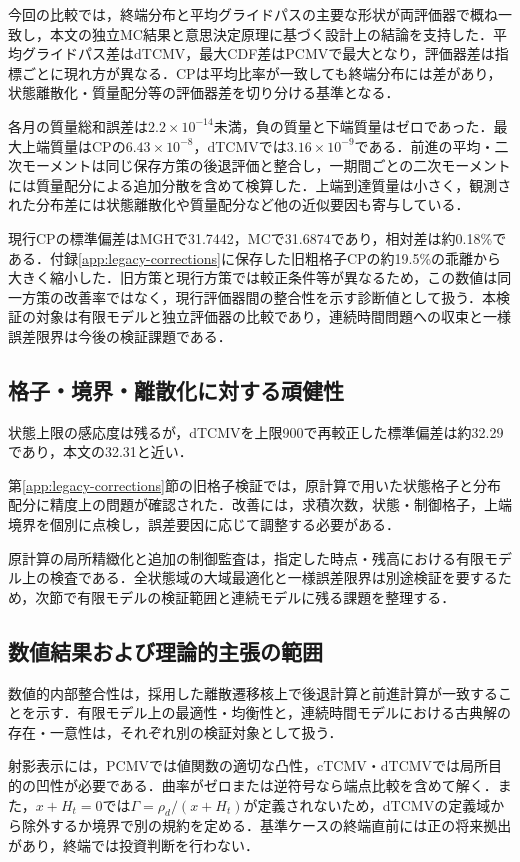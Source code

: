 \documentclass[10pt,a4paper]{article}
\theoremstyle{plain}
\theoremstyle{definition}
\begin{document}
今回の比較では，終端分布と平均グライドパスの主要な形状が両評価器で概ね一致し，本文の独立MC結果と意思決定原理に基づく設計上の結論を支持した．平均グライドパス差はdTCMV，最大CDF差はPCMVで最大となり，評価器差は指標ごとに現れ方が異なる．CPは平均比率が一致しても終端分布には差があり，状態離散化・質量配分等の評価器差を切り分ける基準となる．

各月の質量総和誤差は$2.2\times10^{-14}$未満，負の質量と下端質量はゼロであった．最大上端質量はCPの$6.43\times10^{-8}$，dTCMVでは$3.16\times10^{-9}$である．前進の平均・二次モーメントは同じ保存方策の後退評価と整合し，一期間ごとの二次モーメントには質量配分による追加分散を含めて検算した．上端到達質量は小さく，観測された分布差には状態離散化や質量配分など他の近似要因も寄与している．

現行CPの標準偏差はMGHで31.7442，MCで31.6874であり，相対差は約0.18\%である．付録\ref{app:legacy-corrections}に保存した旧粗格子CPの約19.5\%の乖離から大きく縮小した．旧方策と現行方策では較正条件等が異なるため，この数値は同一方策の改善率ではなく，現行評価器間の整合性を示す診断値として扱う．本検証の対象は有限モデルと独立評価器の比較であり，連続時間問題への収束と一様誤差限界は今後の検証課題である．

\clearpage
\subsection{格子・境界・離散化に対する頑健性}\label{app:validation-robustness}
状態上限の感応度は残るが，dTCMVを上限900で再較正した標準偏差は約32.29であり，本文の32.31と近い．

第\ref{app:legacy-corrections}節の旧格子検証では，原計算で用いた状態格子と分布配分に精度上の問題が確認された．改善には，求積次数，状態・制御格子，上端境界を個別に点検し，誤差要因に応じて調整する必要がある．

原計算の局所精緻化と追加の制御監査は，指定した時点・残高における有限モデル上の検査である．全状態域の大域最適化と一様誤差限界は別途検証を要するため，次節で有限モデルの検証範囲と連続モデルに残る課題を整理する．

\subsection{数値結果および理論的主張の範囲}\label{app:validation-scope}
数値的内部整合性は，採用した離散遷移核上で後退計算と前進計算が一致することを示す．有限モデル上の最適性・均衡性と，連続時間モデルにおける古典解の存在・一意性は，それぞれ別の検証対象として扱う．

射影表示には，PCMVでは値関数の適切な凸性，cTCMV・dTCMVでは局所目的の凹性が必要である．曲率がゼロまたは逆符号なら端点比較を含めて解く．また，$x+H_t=0$では$\Gamma=\rho_d/(x+H_t)$が定義されないため，dTCMVの定義域から除外するか境界で別の規約を定める．基準ケースの終端直前には正の将来拠出があり，終端では投資判断を行わない．
\end{document}

